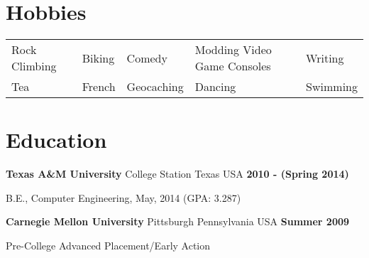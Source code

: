 \documentclass[margin,line]{res}
\newenvironment{list1}{
  \begin{list}{\ding{113}}{%
      \setlength{\itemsep}{0in}
      \setlength{\parsep}{0in} \setlength{\parskip}{0in}
      \setlength{\topsep}{0in} \setlength{\partopsep}{0in} 
      \setlength{\leftmargin}{0.17in}}}{\end{list}}
\newenvironment{list2}{
  \begin{list}{$\bullet$}{%
      \setlength{\itemsep}{0in}
      \setlength{\parsep}{0in} \setlength{\parskip}{0in}
      \setlength{\topsep}{0in} \setlength{\partopsep}{0in} 
      \setlength{\leftmargin}{0.2in}}}{\end{list}}
\begin{document}
{\begin{resume}
    {\color{WildStrawberry}
      \section{\sc Hobbies}}
    \color{black}
    \hspace{-.13in}
    \begin{tabular}{l l l l l}
      Rock Climbing & Biking & Comedy & Modding Video Game Consoles & Writing\\
      Tea & French & Geocaching & Dancing & Swimming\\
    \end{tabular}


    {\color{WildStrawberry}
      \vspace{-.13in}
      \section{\sc Education}}

    {\bf Texas A\&M University} College Station Texas USA \hfill {\bf 2010 - (Spring 2014)}\\
    \vspace*{-.17in}
    \begin{list1}
    \item[] B.E., Computer Engineering, May, 2014 \hfill (GPA: 3.287)
    \end{list1}
    \vspace*{-.15in}

    {\bf Carnegie Mellon University} Pittsburgh Pennsylvania USA \hfill {\bf Summer 2009}\\
    \vspace*{-.17in}
    \begin{list1}
    \item[] Pre-College Advanced Placement/Early Action \hfill\\
      \vspace{-.15in}
    \end{list1}


\end{resume}}
\end{document}
